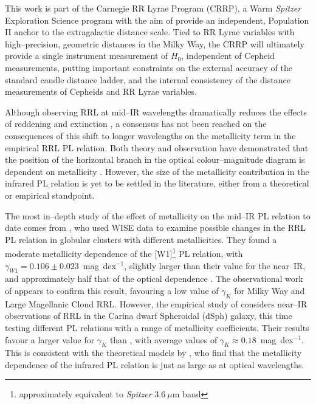 \documentclass[a4paper,fleqn,usenatbib]{mnras}
\begin{document}
This work is part of the Carnegie RR Lyrae Program (CRRP), a Warm {\it Spitzer} Exploration Science program with the aim of provide an independent, Population II anchor to the extragalactic distance scale. Tied to RR Lyrae variables with high--precision, geometric distances in the Milky Way, the CRRP will ultimately provide a single instrument measurement of $H_{0}$, independent of Cepheid measurements, putting important constraints on the external accuracy of the standard candle distance ladder, and the internal consistency of the distance measurements of Cepheids and RR Lyrae variables.
 
 Although observing RRL at mid--IR wavelengths dramatically reduces the effects of reddening and extinction \citep[$A_{[3.6]} \sim A_V / 16$][]{2005ApJ...619..931I}, a consensus has not been reached on the consequences of this shift to longer wavelengths on the metallicity term in the empirical RRL PL relation. Both theory and observation have demonstrated that the position of the horizontal branch in the optical colour--magnitude diagram is dependent on metallicity \citep[e.g.][]{2015ApJ...808...50M, 2004ApJS..154..633C, 2003MNRAS.344.1097B, 1994AJ....108..222N}. However, the size of the metallicity contribution in the infrared PL relation is yet to be settled in the literature, either from a theoretical or empirical standpoint. 
 
The most in--depth study of the effect of metallicity on the mid--IR PL relation to date comes from \citet{2014MNRAS.439.3765D}, who used WISE data \citep{2010AJ....140.1868W, 2013wise.rept....1C} to examine possible changes in the RRL PL relation in globular clusters with different metallicities. They found a moderate metallicity dependence of the [W1]\footnote{approximately equivalent to {\it Spitzer} $3.6~\mu$m band} PL relation, with $\gamma_{W1} = 0.106 \pm 0.023$~mag~dex$^{-1}$, slightly larger than their value for the near--IR, and approximately half that of the optical dependence \citep[$\gamma_{K} = 0.088 \pm 0.026$~mag~dex$^{-1}$, $\gamma_{V} = 0.232 \pm 0.020$~mag~dex$^{-1}$,][]{2013MNRAS.435.3206D}. The observational work of \citet{2015ApJ...807..127M} appears to confirm this result, favouring a low value of $\gamma_K$ for Milky Way and Large Magellanic Cloud RRL. However, the empirical study of \citet{2015AJ....150...90K} considers near--IR observations of RRL in the Carina dwarf Spheroidal (dSph) galaxy, this time testing different PL relations with a range of metallicity coefficients. Their results favour a larger value for $\gamma_K$ than \citet{2015PKAS...30..183D}, with average values of $\gamma_K \approx 0.18$~mag~dex$^{-1}$. This is consistent with the theoretical models by \citet{2015ApJ...808...50M}, who find that the metallicity dependence of the infrared PL relation is just as large as at optical wavelengths.
\end{document}
